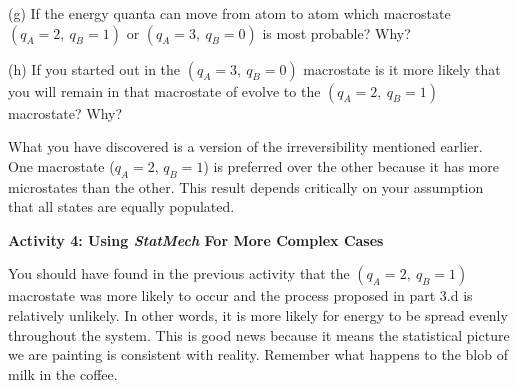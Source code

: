 (g) If the energy quanta can move from atom to atom
which macrostate $(q_A=2, ~ q_B=1)$ or $(q_A=3, ~ q_B=0)$ is most probable? Why?
\vspace{15mm}

(h) If you started out in the $(q_A=3, ~ q_B=0)$ macrostate is it more likely that you will remain
in that macrostate of evolve to the $(q_A=2, ~ q_B=1)$ macrostate? Why?
\vspace{15mm}

What you have discovered is a version of the irreversibility mentioned earlier.
One macrostate ($q_A=2$, $q_B=1$) is preferred over the other because it has more microstates
than the other.
This result depends critically on your assumption that all states are equally populated.

\newpage

\textbf{Activity 4: Using {\it StatMech} For More Complex Cases}

You should have found in the previous activity that the $(q_A=2, ~ q_B=1)$ 
macrostate was more likely
to occur and the process proposed in part 3.d is relatively unlikely.
In other words, it is more likely for energy to be spread evenly throughout the system.
This is good news because it means the statistical picture we are painting is consistent
with reality.
Remember what happens to the blob of milk in the coffee.

